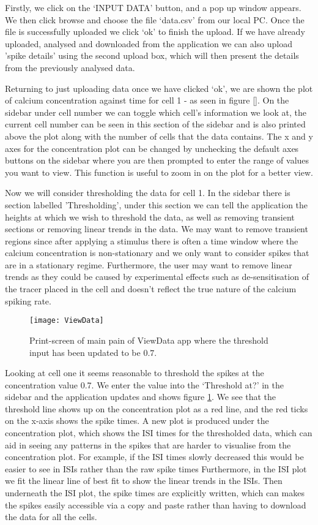 \documentclass[../main.tex]{subfiles}
\begin{document}
Firstly, we click on the `INPUT DATA' button, and a pop up window appears. We then click browse and choose the file `data.csv' from our local PC. Once the file is successfully uploaded we click `ok' to finish the upload. If we have already uploaded, analysed and downloaded from the application we can also upload 'spike details' using the second upload box, which will then present the details from the previously analysed data. 

Returning to just uploading data once we have clicked `ok', we are shown the plot of calcium concentration against time for cell 1 - as seen in figure \ref{}. On the sidebar under cell number we can toggle which cell's information we look at, the current cell number can be seen in this section of the sidebar and is also printed above the plot along with the number of cells that the data contains. The x and y axes for the concentration plot can be changed by unchecking the default axes buttons on the sidebar where you are then prompted to enter the range of values you want to view. This function is useful to zoom in on the plot for a better view. 

Now we will consider thresholding the data for cell 1. In the sidebar there is section labelled 'Thresholding', under this section we can tell the application the heights at which we wish to threshold the data, as well as removing transient sections or removing linear trends in the data. We may want to remove transient regions since after applying a stimulus there is often a time window where the calcium concentration is non-stationary and we only want to consider spikes that are in a stationary regime. Furthermore, the user may want to remove linear trends as they could be caused by experimental effects such as de-sensitisation of the tracer placed in the cell and doesn't reflect the true nature of the calcium spiking rate.

\begin{figure}[t]
	\texttt{[image: ViewData]}
	\caption{Print-screen of main pain of ViewData app where the threshold input has been updated to be $0.7$. }
	\label{fig: ViewData}
\end{figure}

Looking at cell one it seems reasonable to threshold the spikes at the concentration value 0.7. We enter the value into the `Threshold at?' in the sidebar and the application updates and shows figure \ref{fig: ViewData}. We see that the threshold line shows up on the concentration plot as a red line, and the red ticks on the x-axis shows the spike times. A new plot is produced under the concentration plot, which shows the ISI times for the thresholded data, which can aid in seeing any patterns in the spikes that are harder to visualise from the concentration plot. For example, if the ISI times slowly decreased this would be easier to see in ISIs rather than the raw spike times Furthermore, in the ISI plot we fit the linear line of best fit to show the linear trends in the ISIs. Then underneath the ISI plot, the spike times are explicitly written, which can makes the spikes easily accessible via a copy and paste rather than having to download the data for all the cells. 
\end{document}
